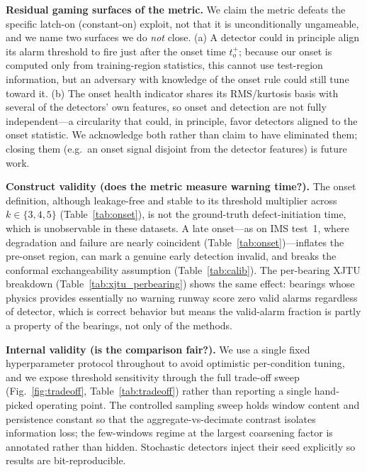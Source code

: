 \documentclass[journal]{IEEEtran}
\begin{document}
\textbf{Residual gaming surfaces of the metric.} We claim the metric defeats the
specific latch-on (constant-on) exploit, not that it is unconditionally
ungameable, and we name two surfaces we do \emph{not} close. (a) A detector
could in principle align its alarm threshold to fire just after the onset time
$t_o^{+}$; because our onset is computed only from training-region statistics,
this cannot use test-region information, but an adversary with knowledge of the
onset rule could still tune toward it. (b) The onset health indicator shares its
RMS/kurtosis basis with several of the detectors' own features, so onset and
detection are not fully independent---a circularity that could, in principle,
favor detectors aligned to the onset statistic. We acknowledge both rather than
claim to have eliminated them; closing them (e.g.\ an onset signal disjoint from
the detector features) is future work.

\textbf{Construct validity (does the metric measure warning time?).} The onset
definition, although leakage-free and stable to its threshold multiplier across
$k\in\{3,4,5\}$ (Table~\ref{tab:onset}), is not the ground-truth
defect-initiation time, which is unobservable in these datasets. A late
onset---as on IMS test~1, where degradation and failure are nearly coincident
(Table~\ref{tab:onset})---inflates the pre-onset region, can mark a genuine
early detection invalid, and breaks the conformal exchangeability assumption
(Table~\ref{tab:calib}). The per-bearing XJTU breakdown
(Table~\ref{tab:xjtu_perbearing}) shows the same effect: bearings whose physics
provides essentially no warning runway score zero valid alarms regardless of
detector, which is correct behavior but means the valid-alarm fraction is partly
a property of the bearings, not only of the methods.

\textbf{Internal validity (is the comparison fair?).} We use a single fixed
hyperparameter protocol throughout to avoid optimistic per-condition tuning, and
we expose threshold sensitivity through the full trade-off sweep
(Fig.~\ref{fig:tradeoff}, Table~\ref{tab:tradeoff}) rather than reporting a
single hand-picked operating point. The controlled sampling sweep holds window
content and persistence constant so that the aggregate-vs-decimate contrast
isolates information loss; the few-windows regime at the largest coarsening
factor is annotated rather than hidden. Stochastic detectors inject their seed
explicitly so results are bit-reproducible.
\end{document}

